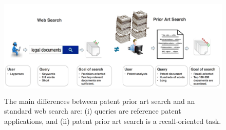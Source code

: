 
\begin{figure}[htpb]
   \centering
   \includegraphics[width=\textwidth,height=49mm]{figs/webprior.png}
   \caption{The main differences between patent prior art search and an standard web search are: (i) queries are reference patent
applications, and (ii) patent prior art search is a recall-oriented task.}  
   \label{fig:compareappr} 
\end{figure}
\FloatBarrier

